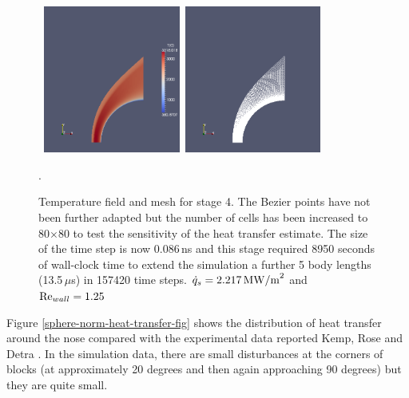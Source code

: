 \begin{figure}[htbp]
\begin{center}
\mbox{
\includegraphics[width=0.4\textwidth]{../2D/sphere-heat-transfer/sphere4-T-field.png}
\includegraphics[width=0.4\textwidth]{../2D/sphere-heat-transfer/sphere4-mesh.png}
}
\end{center}
\caption{Temperature field and mesh for stage 4.
  The Bezier points have not been further adapted but the number of cells has been
  increased to 80$\times$80 to test the sensitivity of the heat transfer estimate.
  The size of the time step is now 0.086\,ns and this stage required 8950 seconds of wall-clock time
  to extend the simulation a further 5 body lengths (13.5\,$\mu$s) in 157420 time steps.
  $\dot{q}_s =2 .217\,{\rm MW/m}^2$ and ${\rm Re}_{wall} = 1.25$}.
\label{sphere-heat-transfer-stage-4-fig}
\end{figure}

Figure \ref{sphere-norm-heat-transfer-fig} shows the distribution of heat transfer around the nose
compared with the experimental data reported Kemp, Rose and Detra \cite{kemp_etal_1959}.
In the simulation data, there are small disturbances at the corners of blocks 
(at approximately 20 degrees and then again approaching 90 degrees) but they are quite small.

